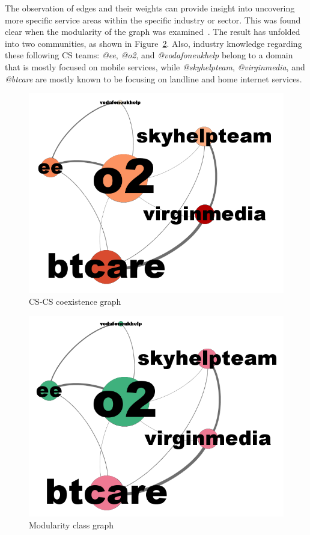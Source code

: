 \documentclass[sigconf]{acmart}
\begin{document}
{The observation of edges and their weights can provide insight into
uncovering more specific service areas within the specific industry or
sector. This was found clear when the modularity of the graph was
examined~\cite{Blondel2008}. The result has unfolded into two
communities, as shown in Figure~\ref{fig:modularityclassgraph}. Also,
industry knowledge regarding these following CS teams: {\emph{@ee}},
{\emph{@o2}}, and {\emph{@vodafoneukhelp}} belong to a domain that is
mostly focused on mobile services, while {\emph{@skyhelpteam}},
{\emph{@virginmedia}}, and {\emph{@btcare}} are mostly known to be
focusing on landline and home internet services.

\begin{figure}[htb]
\centering
\includegraphics[width=\columnwidth]{images/coexistencegraph.png}
\caption{CS-CS coexistence graph}
\label{fig:coexistencegraph}
\end{figure}

\begin{figure}[htb]
\centering
\includegraphics[width=\columnwidth]{images/modularityclassgraph.png}
\caption{Modularity class graph}
\label{fig:modularityclassgraph}
\end{figure}

}
\end{document}
